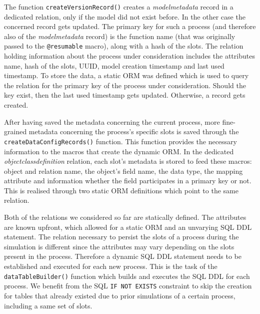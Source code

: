 \documentclass{juliacon}
\begin{document}
The function \texttt{createVersionRecord()} creates a \textit{modelmetadata} record in a dedicated relation, only if the model did not exist before. In the other case the concerned record gets updated. 
The primary key for such a process (and therefore also of the \textit{modelmetadata} record) is the function name (that was originally passed to the \texttt{@resumable} macro), along with a hash of the slots. The relation holding information about the process under consideration includes the attributes name, hash of the slots, UUID, model creation timestamp and last used timestamp. To store the data, a static ORM was defined which is used to query the relation for the primary key of the process under consideration. Should the key exist, then the last used timestamp gets updated. Otherwise, a record gets created. \vskip 6pt

After having saved the metadata concerning the current process, more fine-grained metadata concerning the process's specific slots is saved through the \texttt{createDataConfigRecords()} function. This function provides the necessary information to the macros that create the dynamic ORM. In the dedicated \textit{objectclassdefinition} relation, each slot's metadata is stored to feed these macros: object and relation name, the object's field name, the data type, the mapping attribute and information whether the field participates in a primary key or not. This is realised through two static ORM definitions which point to the same relation. \vskip 6pt

Both of the relations we considered so far are statically defined. The attributes are known upfront, which allowed for a static ORM and an unvarying SQL DDL statement. The relation necessary to persist the slots of a process during the simulation is different since the attributes may vary depending on the slots present in the process. Therefore a dynamic SQL DDL statement needs to be established and executed for each new process. This is the task of the \texttt{dataTableBuilder()} function which builds and executes the SQL DDL for each process. We benefit from the SQL \texttt{IF NOT EXISTS} constraint to skip the creation for tables that already existed due to prior simulations of a certain process, including a same set of slots. \vskip 6pt
\end{document}
